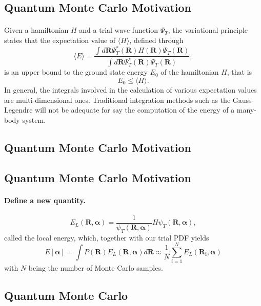 \documentclass[aip,jcp,reprint,floatfix]{revtex4-1}
\begin{document}
\begin{itemize}
\subsection*{Quantum Monte Carlo Motivation}

\paragraph{}
Given a hamiltonian $H$ and a trial wave function $\Psi_T$, the variational principle states that the expectation value of $\langle H \rangle$, defined through 
\[
   \langle E \rangle =
   \frac{\int d\bm{R}\Psi^{\ast}_T(\bm{R})H(\bm{R})\Psi_T(\bm{R})}
        {\int d\bm{R}\Psi^{\ast}_T(\bm{R})\Psi_T(\bm{R})},
\]
is an upper bound to the ground state energy $E_0$ of the hamiltonian $H$, that is 
\[
    E_0 \le \langle H \rangle .
\]
In general, the integrals involved in the calculation of various  expectation values  are multi-dimensional ones. Traditional integration methods such as the Gauss-Legendre will not be adequate for say the  computation of the energy of a many-body system.




\subsection*{Quantum Monte Carlo Motivation}


\subsection*{Quantum Monte Carlo Motivation}

\paragraph{Define a new quantity.}
\[
   E_L(\bm{R},\bm{\alpha})=\frac{1}{\psi_T(\bm{R},\bm{\alpha})}H\psi_T(\bm{R},\bm{\alpha}),
\]
called the local energy, which, together with our trial PDF yields
\[
  E[\bm{\alpha}]=\int P(\bm{R})E_L(\bm{R},\bm{\alpha}) d\bm{R}\approx \frac{1}{N}\sum_{i=1}^NE_L(\bm{R_i},\bm{\alpha})
\]
with $N$ being the number of Monte Carlo samples.




\subsection*{Quantum Monte Carlo}


\end{itemize}
\end{document}
